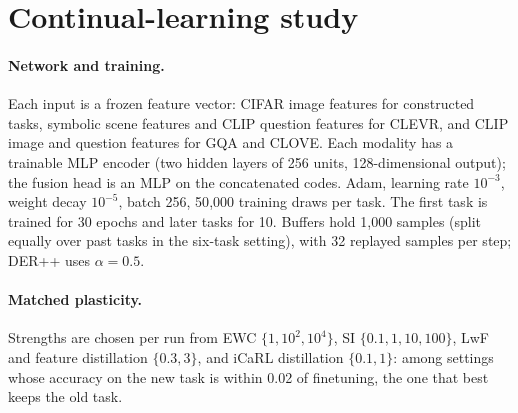 \begin{table}[t]
\centering
\caption{Cell-level AUC for predicting the answers EMAP flips (full tables, three models). Binary exception labels use
the solver's rule; Sec.~\ref{sup:unique} reports stable labels on the Study C sub-tables, where the binary label
($0.60$--$0.66$) does not beat confidence ($0.63$--$0.73$) but graded misfit does ($0.78$--$0.88$).}
\label{tab:cell_auc}
\end{table}


\section{Continual-learning study}
\label{sup:cl}

\paragraph{Network and training.}
Each input is a frozen feature vector: CIFAR image features for constructed tasks, symbolic
scene features and CLIP question features for CLEVR, and CLIP image and question features for
GQA and CLOVE. Each modality has a trainable MLP encoder (two hidden layers of 256 units,
128-dimensional output); the fusion head is an MLP on the concatenated codes. Adam, learning rate
$10^{-3}$, weight decay $10^{-5}$, batch 256, 50{,}000 training draws per task. The first task
is trained for 30 epochs and later tasks for 10. Buffers hold 1{,}000 samples (split equally
over past tasks in the six-task setting), with 32 replayed samples per step; DER++ uses
$\alpha=0.5$.

\paragraph{Matched plasticity.}
Strengths are chosen per run from EWC $\{1,10^2,10^4\}$, SI $\{0.1,1,10,100\}$, LwF and
feature distillation $\{0.3,3\}$, and iCaRL distillation $\{0.1,1\}$: among settings whose
accuracy on the new task is within 0.02 of finetuning, the one that best keeps the old task.

